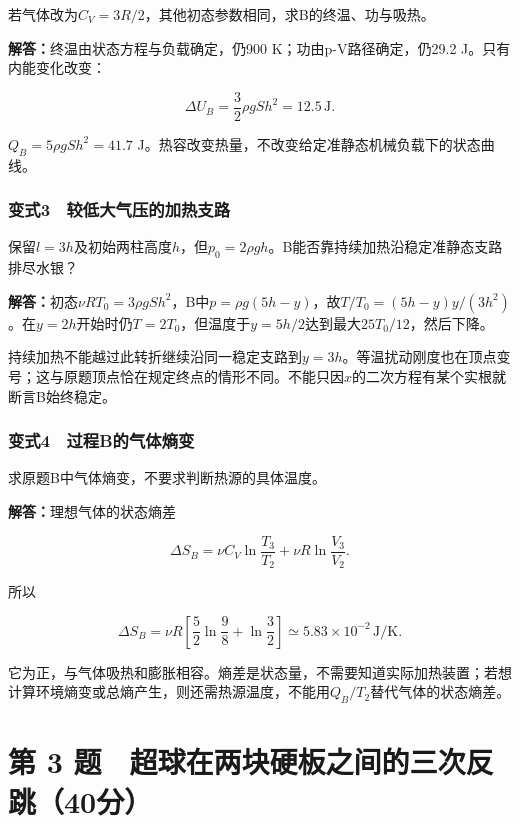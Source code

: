 \documentclass[12pt,a4paper,fontset=fandol]{ctexart}
\begin{document}
若气体改为\(C_V=3R/2\)，其他初态参数相同，求B的终温、功与吸热。

\textbf{解答：}终温由状态方程与负载确定，仍900
K；功由p-V路径确定，仍29.2 J。只有内能变化改变：

\[
\Delta U_B=\frac32\rho gSh^2=12.5\,\mathrm J.
\]

\(Q_B=5\rho gSh^2=41.7\)
J。热容改变热量，不改变给定准静态机械负载下的状态曲线。

\subsubsection{变式3　较低大气压的加热支路}\label{ux53d8ux5f0f3-ux8f83ux4f4eux5927ux6c14ux538bux7684ux52a0ux70edux652fux8def}

保留\(l=3h\)及初始两柱高度\(h\)，但\(p_0=2\rho gh\)。B能否靠持续加热沿稳定准静态支路排尽水银？

\textbf{解答：}初态\(\nu RT_0=3\rho gSh^2\)，B中\(p=\rho g(5h-y)\)，故\(T/T_0=(5h-y)y/(3h^2)\)。在\(y=2h\)开始时仍\(T=2T_0\)，但温度于\(y=5h/2\)达到最大\(25T_0/12\)，然后下降。

持续加热不能越过此转折继续沿同一稳定支路到\(y=3h\)。等温扰动刚度也在顶点变号；这与原题顶点恰在规定终点的情形不同。不能只因\(x\)的二次方程有某个实根就断言B始终稳定。

\subsubsection{变式4　过程B的气体熵变}\label{ux53d8ux5f0f4-ux8fc7ux7a0bbux7684ux6c14ux4f53ux71b5ux53d8}

求原题B中气体熵变，不要求判断热源的具体温度。

\textbf{解答：}理想气体的状态熵差

\[
\Delta S_B=\nu C_V\ln\frac{T_3}{T_2}
+\nu R\ln\frac{V_3}{V_2}.
\]

所以

\[
\Delta S_B=\nu R
\left[\frac52\ln\frac98+\ln\frac32\right]
\simeq5.83\times10^{-2}\,\mathrm{J/K}.
\]

它为正，与气体吸热和膨胀相容。熵差是状态量，不需要知道实际加热装置；若想计算环境熵变或总熵产生，则还需热源温度，不能用\(Q_B/T_2\)替代气体的状态熵差。

\clearpage

\section{第 3
题　超球在两块硬板之间的三次反跳（40分）}\label{ux7b2c-3-ux9898-ux8d85ux7403ux5728ux4e24ux5757ux786cux677fux4e4bux95f4ux7684ux4e09ux6b21ux53cdux8df340ux5206}
\end{document}
